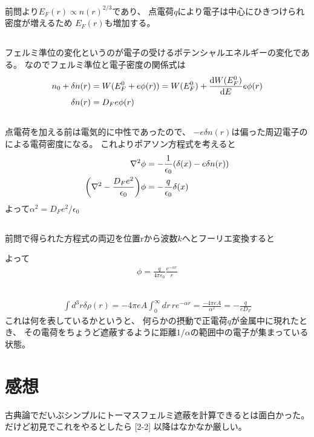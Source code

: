 \documentclass[../../master.tex]{subfiles}
\begin{document}
\subsection{}
前問より\(E_F(r)\propto n(r)^{2/3}\)であり、
点電荷\(q\)により電子は中心にひきつけられ密度が増えるため
\(E_F(r)\)も増加する。
\subsection{}
フェルミ準位の変化というのが電子の受けるポテンシャルエネルギーの変化である。
なのでフェルミ準位と電子密度の関係式は
\begin{align}
    n_0+\delta n(r) &= W(E_F^0+e\phi(r)) = W(E_F^0) +\dv{W(E_F^0)}{E}e\phi(r)\\
    \delta n(r) &= D_Fe\phi(r)
\end{align}

\subsection{}
点電荷を加える前は電気的に中性であったので、
\(-e\delta n(r)\)は偏った周辺電子のによる電荷密度になる。
これよりポアソン方程式を考えると
\begin{align}
    \laplacian \phi &= -\frac{1}{\epsilon_0}\qty(\delta(x) - e\delta n(r))\\
    \qty(\laplacian - \frac{D_F e^2}{\epsilon_0})\phi &= -\frac{q}{\epsilon_0}\delta(x)
\end{align}
よって\(\alpha^2=D_Fe^2/\epsilon_0\)

\subsection{}
前問で得られた方程式の両辺を位置rから波数\(k\)へとフーリエ変換すると

よって
\begin{align}
    \phi = \frac{q}{4\pi\epsilon_0}\frac{e^{-\alpha r}}{r}
\end{align}

\subsection{}
\begin{align}
    \int d^3r \delta \rho(r) = -4\pi eA \int_0^\infty dr\, re^{-\alpha r} =\frac{-4\pi eA}{\alpha^2}=-\frac{q}{eD_F}
\end{align}
これは何を表しているかというと、
何らかの摂動で正電荷\(q\)が金属中に現れたとき、
その電荷をちょうど遮蔽するように距離\(1/\alpha\)の範囲中の電子が集まっている状態。

\section*{感想}
古典論でだいぶシンプルにトーマスフェルミ遮蔽を計算できるとは面白かった。
だけど初見でこれをやるとしたら [2-2] 以降はなかなか厳しい。
\end{document}
